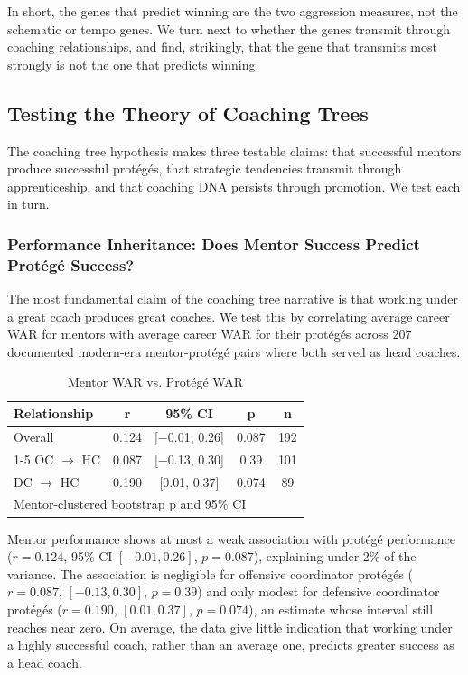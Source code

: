 \documentclass[USenglish]{article}
\theoremstyle{dgthm}
\theoremstyle{dgdef}
\begin{document}
In short, the genes that predict winning are the two aggression measures, not the schematic or tempo genes. We turn next to whether the genes transmit through coaching relationships, and find, strikingly, that the gene that transmits most strongly is not the one that predicts winning.

\subsection{Testing the Theory of Coaching Trees}

The coaching tree hypothesis makes three testable claims: that successful mentors produce successful prot\'{e}g\'{e}s, that strategic tendencies transmit through apprenticeship, and that coaching DNA persists through promotion. We test each in turn.

\subsubsection{Performance Inheritance: Does Mentor Success Predict Prot\'{e}g\'{e} Success?}

The most fundamental claim of the coaching tree narrative is that working under a great coach produces great coaches. We test this by correlating average career WAR for mentors with average career WAR for their prot\'{e}g\'{e}s across 207 documented modern-era mentor-prot\'{e}g\'{e} pairs where both served as head coaches.

\begin{table}[H]
\caption{Mentor WAR vs. Prot\'{e}g\'{e} WAR}
\label{tab:war_inherit}
\begin{tabular}{lcccc}
\toprule
\textbf{Relationship} & \textbf{r} & \textbf{95\% CI} & \textbf{p} & \textbf{n} \\
\midrule
Overall & 0.124 & [$-$0.01, 0.26] & 0.087 & 192 \\
\cmidrule{1-5}
OC $\rightarrow$ HC & 0.087 & [$-$0.13, 0.30] & 0.39 & 101 \\
DC $\rightarrow$ HC & 0.190 & [0.01, 0.37] & 0.074 & 89 \\
\midrule
\multicolumn{5}{l}{\small Mentor-clustered bootstrap p and 95\% CI}\\
\bottomrule
\end{tabular}
\end{table}

Mentor performance shows at most a weak association with prot\'{e}g\'{e} performance ($r=0.124$, 95\% CI $[-0.01, 0.26]$, $p=0.087$), explaining under 2\% of the variance. The association is negligible for offensive coordinator prot\'{e}g\'{e}s ($r=0.087$, $[-0.13, 0.30]$, $p=0.39$) and only modest for defensive coordinator prot\'{e}g\'{e}s ($r=0.190$, $[0.01, 0.37]$, $p=0.074$), an estimate whose interval still reaches near zero. On average, the data give little indication that working under a highly successful coach, rather than an average one, predicts greater success as a head coach.
\end{document}
